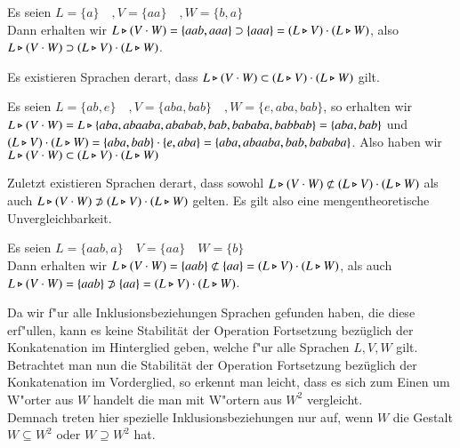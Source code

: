 \vspace{2ex}

\begin{beispiel}
Es seien $L=\{a\}\quad ,V=\{aa\}\quad ,W=\{b,a\} $\\
Dann erhalten wir $L\triangleright (V\cdot W) = \{aab,aaa\} \supset  \{aaa\} = (L\triangleright V) \cdot (L\triangleright W)$, also $L\triangleright (V\cdot W) \supset (L\triangleright V) \cdot (L\triangleright W)$.
\end{beispiel}
Es existieren Sprachen derart, dass $L\triangleright (V\cdot W) \subset (L\triangleright V)\cdot (L\triangleright W)$ gilt.

\vspace{2ex}

\begin{beispiel}
Es seien  $L=\{ab,e\}\quad ,V=\{aba,bab\}\quad ,W=\{e,aba,bab\} $, so erhalten wir \\
$L\triangleright (V\cdot W) = L \triangleright \{aba,abaaba,ababab,bab,bababa,babbab\} = \{ aba,bab\}$ und $(L\triangleright V)\cdot (L\triangleright W) = \{aba,bab\} \cdot \{e,aba\} = \{aba,abaaba,bab,bababa\}$. 
Also haben wir $L\triangleright (V\cdot W) \subset (L\triangleright V)\cdot (L\triangleright W)$
\end{beispiel}
Zuletzt existieren Sprachen derart, dass sowohl $L\triangleright (V\cdot W) \not\subset (L\triangleright V)\cdot (L\triangleright W)$ als auch $L\triangleright (V\cdot W) \not\supset (L\triangleright V)\cdot (L\triangleright W)$ gelten. Es gilt also eine mengentheoretische Unvergleichbarkeit.

\vspace{2ex}

\begin{beispiel}
Es seien $L=\{aab,a\}\quad V=\{aa\}\quad W=\{b\}$\\
Dann erhalten wir $L\triangleright (V\cdot W) = \{aab\} \not\subset \{aa\} = (L\triangleright V) \cdot (L\triangleright W)$, als auch $L\triangleright (V\cdot W) = \{aab\} \not\supset \{aa\} = (L\triangleright V) \cdot (L\triangleright W)$.
\end{beispiel}

Da wir f"ur alle Inklusionsbeziehungen Sprachen gefunden haben, die diese erf"ullen, kann es keine Stabilität der Operation Fortsetzung bezüglich der Konkatenation im Hinterglied geben, welche f"ur alle Sprachen $L,V,W$ gilt.\\

Betrachtet man nun die Stabilität der Operation Fortsetzung bezüglich der Konkatenation im Vorderglied, so erkennt man leicht, dass es sich 
zum Einen um W"orter aus $W$ handelt die man mit W"ortern aus $W^2$ vergleicht.\\
Demnach treten hier spezielle Inklusionsbeziehungen nur auf, wenn $W$ die Gestalt $W\subseteq W^2$ oder $W\supseteq W^2$ hat.

